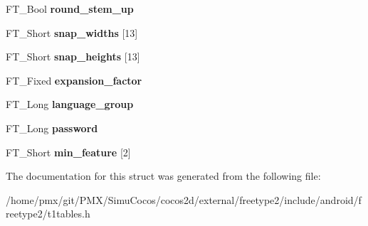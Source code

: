 \begin{DoxyCompactItemize}
F\+T\+\_\+\+Bool {\bfseries round\+\_\+stem\+\_\+up}
\item 
\mbox{\label{structPS__PrivateRec___a2eb4b322671ee19a51347855b4b9ef32}} 
F\+T\+\_\+\+Short {\bfseries snap\+\_\+widths} \mbox{[}13\mbox{]}
\item 
\mbox{\label{structPS__PrivateRec___a606c3ffbb4e066432cc2a081fb6fbfd1}} 
F\+T\+\_\+\+Short {\bfseries snap\+\_\+heights} \mbox{[}13\mbox{]}
\item 
\mbox{\label{structPS__PrivateRec___a45cf6e07c4c26f029e66998e6cad9fa0}} 
F\+T\+\_\+\+Fixed {\bfseries expansion\+\_\+factor}
\item 
\mbox{\label{structPS__PrivateRec___afc2a7f950a174577ebfc062bb1598f5c}} 
F\+T\+\_\+\+Long {\bfseries language\+\_\+group}
\item 
\mbox{\label{structPS__PrivateRec___a309a871cdeb6f658d8fbff23fa13b667}} 
F\+T\+\_\+\+Long {\bfseries password}
\item 
\mbox{\label{structPS__PrivateRec___acbbc84354efd4f93f31cd203a36da514}} 
F\+T\+\_\+\+Short {\bfseries min\+\_\+feature} \mbox{[}2\mbox{]}
\end{DoxyCompactItemize}


The documentation for this struct was generated from the following file\+:\begin{DoxyCompactItemize}
\item 
/home/pmx/git/\+P\+M\+X/\+Simu\+Cocos/cocos2d/external/freetype2/include/android/freetype2/t1tables.\+h\end{DoxyCompactItemize}
